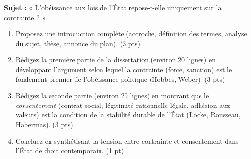 \documentclass[11pt]{article}
\begin{document}
\begin{exercice}
\textbf{Sujet :} « L'obéissance aux lois de l'État repose-t-elle uniquement sur la contrainte ? »

\begin{enumerate}
    \item Proposez une introduction complète (accroche, définition des termes, analyse du sujet, thèse, annonce du plan). \hfill (3 pts)
    \item Rédigez la première partie de la dissertation (environ 20 lignes) en développant l'argument selon lequel la contrainte (force, sanction) est le fondement premier de l'obéissance politique (Hobbes, Weber). \hfill (3 pts)
    \item Rédigez la seconde partie (environ 20 lignes) en montrant que le \textit{consentement} (contrat social, légitimité rationnelle-légale, adhésion aux valeurs) est la condition de la stabilité durable de l'État (Locke, Rousseau, Habermas). \hfill (3 pts)
    \item Concluez en synthétisant la tension entre contrainte et consentement dans l'État de droit contemporain. \hfill (1 pt)
\end{enumerate}
\end{exercice}
\end{document}
